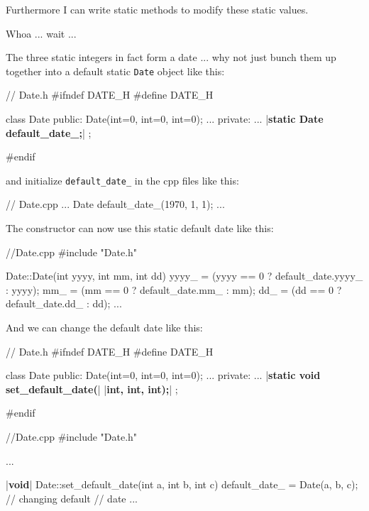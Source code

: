 Furthermore I can write static methods to modify these static values.

Whoa ... wait ...

The three static integers in fact form a date ... why not just
bunch them up together into a default static \texttt{Date} object like
this:

\begin{consolethree}[escapeinside=||]
// Date.h
#ifndef DATE_H
#define DATE_H

class Date
{
public:
    Date(int=0, int=0, int=0);
    ...
private:
    ...
    |{\bf static Date default\_date\_;}|
};

#endif
\end{consolethree}

and initialize \texttt{default\_date\_} in the cpp files like this:

\begin{consolethree}[escapeinside=||]
// Date.cpp
...
Date default_date_(1970, 1, 1);
...
\end{consolethree}

The constructor can now use this static default date like this:

\begin{consolethree}[escapeinside=||]
//Date.cpp
#include "Date.h"

Date::Date(int yyyy, int mm, int dd)
{
    yyyy_ = (yyyy == 0 ? default_date.yyyy_ : yyyy);
    mm_ = (mm == 0 ? default_date.mm_ : mm);
    dd_ = (dd == 0 ? default_date.dd_ : dd);
}
...
\end{consolethree}

And we can change the default date like this:

\begin{consolethree}[escapeinside=||]
// Date.h
#ifndef DATE_H
#define DATE_H

class Date
{
public:
    Date(int=0, int=0, int=0);
    ...
private:
    ...
    |{\bf static void set\_default\_date(}|
        |{\bf int, int, int);}|
};

#endif
\end{consolethree}

\begin{consolethree}[escapeinside=||]
//Date.cpp
#include "Date.h"

...

|{\bf void}| Date::set_default_date(int a, int b, int c)
{
    default_date_ = Date(a, b, c); // changing default
                                   // date
}
...
\end{consolethree}

